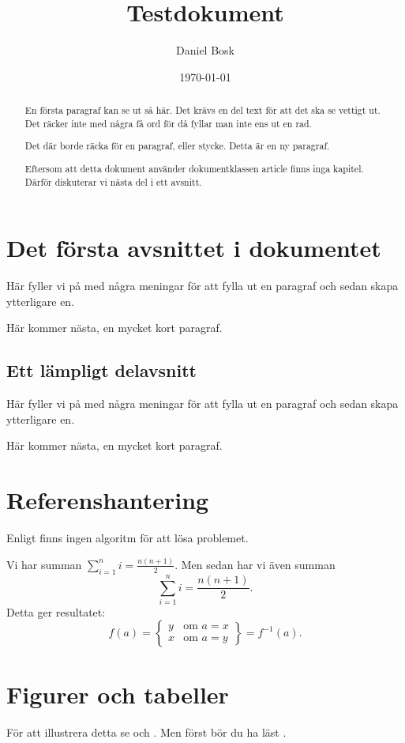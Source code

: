\documentclass[a4paper]{article}
\author{Daniel Bosk}
\title{Testdokument}
\date{\today}
\begin{document}
	\maketitle

	\begin{abstract}
    En första paragraf kan se ut så här.
		Det krävs en del text för att det ska se vettigt ut.
		Det räcker inte med några få ord för då fyllar man inte ens ut en rad.

		Det där borde räcka för en paragraf, eller stycke.
		Detta är en ny paragraf.

		Eftersom att detta dokument använder dokumentklassen article finns inga 
		kapitel.
		Därför diskuterar vi nästa del i ett avsnitt.
	\end{abstract}

	\tableofcontents

	\section[Första avsnittet]{Det första avsnittet i dokumentet}
	\label{sec:First}
  Här fyller vi på med några meningar för att fylla ut en paragraf och sedan 
  skapa ytterligare en.

	Här kommer nästa, en mycket kort paragraf.

	\subsection[Delavsnittet]{Ett lämpligt delavsnitt}
	\label{sub:Del}
  Här fyller vi på med några meningar för att fylla ut en paragraf och sedan 
  skapa ytterligare en.

	Här kommer nästa, en mycket kort paragraf.


	\section{Referenshantering}
	\label{sec:Ref}
  Enligt \citet{Knuth1997tao} finns ingen algoritm för att lösa problemet.

	Vi har summan \( \sum_{i=1}^n i = \frac{n (n + 1)}{2} \).
  Men sedan har vi även summan \[ \sum_{i=1}^n i = \frac{n (n + 1)}{2}. \]
	Detta ger resultatet:
	\[ f(a) = \left\{
		\begin{array}{ll}
			y & \text{om } a=x \\
			x & \text{om } a=y
		\end{array}
		\right\} = f^{-1}(a). \]


	\section{Figurer och tabeller}
	\label{sec:FigTab}
  För att illustrera detta se  och 
  .
	Men först bör du ha läst .
\end{document}
